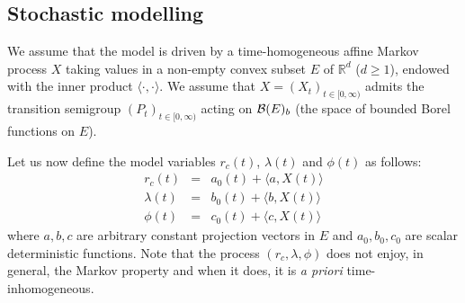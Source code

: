 \documentclass[12pt,a4paper]{article}
\theoremstyle{plain}
\numberwithin{equation}{section}
\begin{document}

\subsection{Stochastic modelling}
We assume that the model is driven by a  time-homogeneous affine Markov process  $X$ taking values in a non-empty convex subset $E$ of $\mathbb{R}^d$ ($d\geq 1$), endowed with the inner product $\langle \cdot, \cdot \rangle$.
We assume that $X = (X_t)_{t \in [0,\infty)}$ admits the transition semigroup $(P_t)_{t \in [0,\infty)}$ acting on ${\cal B}(E)_b$ (the space of bounded Borel functions on $E$).
%

Let us now define the model variables $r_c(t)$, $\lambda(t)$ and $\phi(t)$ as follows:
\begin{eqnarray}
r_c(t)    &=& a_0(t)+\langle a, X(t)\rangle\label{r_c}\\
\lambda(t) &=& b_0(t)+\langle b, X(t)\rangle\label{lambda}\\
\phi(t)    &=& c_0(t)+\langle c,X(t)\rangle\label{phi}
\end{eqnarray}
where $a,b,c$  are arbitrary constant projection vectors in $E$ and $a_0,b_0,c_0$ are scalar deterministic functions.
Note that the process $(r_c,\lambda, \phi )$ does not enjoy, in general, the Markov property and when it does, it is \emph{a priori} time-inhomogeneous.
\end{document}
